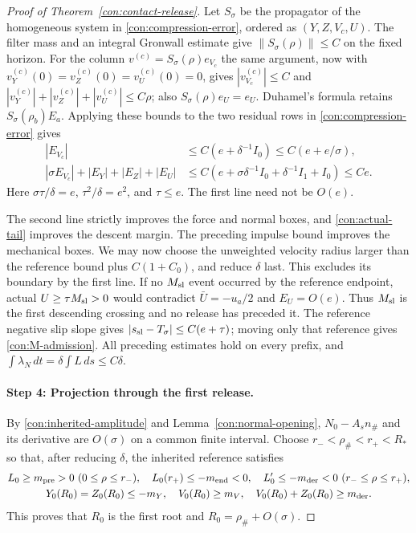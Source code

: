 \begin{proof}[Proof of Theorem~\ref{con:contact-release}]
Let $S_\sigma$ be the propagator of the homogeneous system in
\eqref{con:compression-error}, ordered as $(Y,Z,V_c,U)$.
The filter mass and an integral Gronwall estimate give
$\|S_\sigma(\rho)\|\le C$ on the fixed horizon.  For
the column $v^{(c)}=S_\sigma(\rho)e_{V_c}$ the same argument, now with
$v_Y^{(c)}(0)=v_Z^{(c)}(0)=v_U^{(c)}(0)=0$, gives
$|v_{V_c}^{(c)}|\le C$ and
$|v_Y^{(c)}|+|v_Z^{(c)}|+|v_U^{(c)}|\le C\rho$;
also $S_\sigma(\rho)e_U=e_U$.  Duhamel's formula retains
$S_\sigma(\rho_b)E_a$.  Applying these bounds to the two residual
rows in \eqref{con:compression-error} gives
\begin{equation}
 \begin{aligned}
 |E_{V_c}|&\le C(e+\delta^{-1}I_0)\le C(e+e/\sigma),\\
 |\sigma E_{V_c}|+|E_Y|+|E_Z|+|E_U|
 &\le C(e+\sigma\delta^{-1}I_0+\delta^{-1}I_1+I_0)\le Ce.
 \end{aligned}
 \label{con:weighted-tail}
\end{equation}
Here $\sigma\tau/\delta=e$, $\tau^2/\delta=e^2$, and $\tau\le e$.
The first line need not be $O(e)$.

The second line strictly improves the force and normal boxes, and
\eqref{con:actual-tail} improves the descent margin.  The preceding
impulse bound improves the mechanical boxes.  We may now choose the
unweighted velocity radius larger than the reference bound plus
$C(1+C_0)$, and reduce $\delta$ last.  This excludes its boundary
by the first line.  If no $M_{\rm sl}$ event occurred by the reference endpoint,
actual $U\ge\tau M_{\rm sl}>0$ would contradict $\bar U=-u_a/2$ and
$E_U=O(e)$.  Thus $M_{\rm sl}$ is the first descending crossing and no release
has preceded it.  The reference negative slip slope gives
$|s_{\rm sl}-T_\sigma|\le C(e+\tau)$; moving only that reference gives
\eqref{con:M-admission}.  All preceding estimates hold on every
prefix, and $\int\lambda_N\,dt=\delta\int L\,ds\le C\delta$.

\paragraph{Step 4: Projection through the first release.}

By \eqref{con:inherited-amplitude} and Lemma~\ref{con:normal-opening},
$N_0-A_sn_\#$ and its derivative are $O(\sigma)$ on a common finite
interval.  Choose $r_-<\rho_\#<r_+<R_*$ so that, after reducing
$\delta$, the inherited reference satisfies
\begin{equation}
 \begin{gathered}
 L_0\ge m_{\rm pre}>0\ (0\le\rho\le r_-),\quad
 L_0(r_+)\le-m_{\rm end}<0,\quad
 L_0'\le-m_{\rm der}<0\ (r_-\le\rho\le r_+),\\
 Y_0(R_0)=Z_0(R_0)\le-m_Y,
 \quad V_0(R_0)\ge m_V,\quad
 V_0(R_0)+Z_0(R_0)\ge m_{\rm der}.
 \end{gathered}
 \label{con:reference-release-margins}
\end{equation}
This proves that $R_0$ is the first root and $R_0=\rho_\#+O(\sigma)$.


\end{proof}
